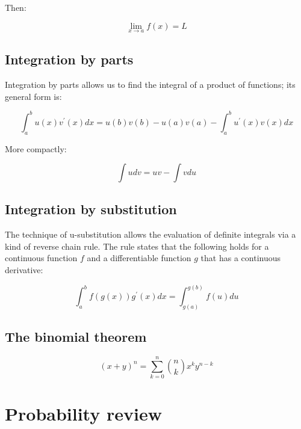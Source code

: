 \documentclass{report}
\begin{document}
Then:

\begin{equation}\label{eq:squeeze}
    \lim_{x\to a} f(x) = L
\end{equation}

\subsection{Integration by parts}

Integration by parts allows us to find the integral of a product of functions; its general form is:

\begin{equation}\label{eq:integral-by-parts-general}
    \int_a^b u(x) v^\prime(x) dx = u(b)v(b) - u(a)v(a) - \int_a^b u^\prime(x) v(x) dx
\end{equation}

More compactly:

\begin{equation}\label{eq:integral-by-parts-simple}
   \int u dv = uv - \int v du 
\end{equation}

\subsection{Integration by substitution}

The technique of u-substitution allows the evaluation of definite integrals via a kind of reverse chain rule. The rule states that the following holds for a continuous function $f$ and a differentiable function $g$ that has a continuous derivative:

\begin{equation}\label{eq:integral-by-sub}
    \int_a^b f(g(x))g^\prime(x) dx = \int_{g(a)}^{g(b)} f(u) du
\end{equation}

\subsection{The binomial theorem}

\begin{equation}\label{eq:binomial-theorem}
    (x + y)^n = \sum_{k=0}^n \binom{n}{k} x^ky^{n-k}
\end{equation}

\section{Probability review}\label{sec:tools-probability}
\end{document}
